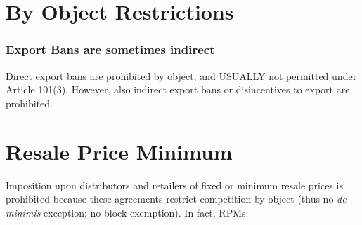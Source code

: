 \section{By Object Restrictions}

        \subsubsection{Export Bans are sometimes indirect}

            Direct export bans are prohibited by object, and USUALLY not permitted under Article 101(3). However, also indirect export bans or disincentives to export are prohibited. 

            
\section{Resale Price Minimum}

            Imposition upon distributors and retailers of fixed or minimum resale prices is prohibited because these agreements restrict competition by object (thus no \emph{de minimis} exception; no block exemption). In fact, RPMs:
            
